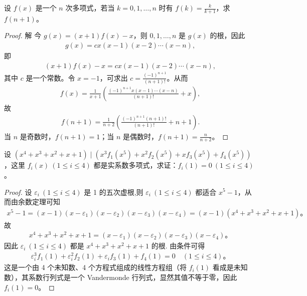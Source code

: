 \documentclass[../../main.tex]{subfiles}%
\begin{document}
\begin{example}
设 $f(x)$ 是一个 $n$ 次多项式，若当 $k = 0, 1, \ldots, n$ 时有 $f(k) = \frac{k}{k + 1}$，求 $f(n + 1)$。
\end{example}
\begin{proof}

解 今 $g(x) = (x + 1)f(x) - x$，则 $0, 1, \ldots, n$ 是 $g(x)$ 的根，因此
\begin{align*}
g(x) = c x(x - 1)(x - 2) \cdots (x - n),
\end{align*}
即
\begin{align*}
(x + 1)f(x) - x = c x(x - 1)(x - 2) \cdots (x - n),
\end{align*}
其中 $c$ 是一个常数。令 $x = -1$，可求出 $c = \frac{(-1)^{n+1}}{(n + 1)!}$。从而
\begin{align*}
f(x) = \frac{1}{x + 1} \left( \frac{(-1)^{n+1} x(x - 1) \cdots (x - n)}{(n + 1)!} + x \right),
\end{align*}
故
\begin{align*}
f(n + 1) = \frac{1}{n + 2} \left( \frac{(-1)^{n+1} (n + 1)!}{(n + 1)!} + n + 1 \right).
\end{align*}
当 $n$ 是奇数时，$f(n + 1) = 1$；当 $n$ 是偶数时，$f(n + 1) = \frac{n}{n + 2}$。

\end{proof}

\begin{example}
设 $(x^4 + x^3 + x^2 + x + 1) \mid (x^3 f_1(x^5) + x^2 f_2(x^5) + x f_3(x^5) + f_4(x^5))$，这里 $f_i(x) \ (1 \leqslant  i \leqslant  4)$ 都是实系数多项式，求证：$f_i(1) = 0 \ (1 \leqslant  i \leqslant  4)$。
\end{example}
\begin{proof}

设 $\varepsilon_i \ (1 \leqslant  i \leqslant  4)$ 是 1 的五次虚根,则 $\varepsilon_i \ (1 \leqslant  i \leqslant  4)$ 都适合 $x^5 - 1$，从而由余数定理可知
\begin{align*}
x^5 - 1 = (x - 1)(x - \varepsilon_1)(x - \varepsilon_2)(x - \varepsilon_3)(x - \varepsilon_4) = (x - 1)(x^4 + x^3 + x^2 + x + 1)。
\end{align*}
故
\begin{align*}
x^4 + x^3 + x^2 + x + 1 = (x - \varepsilon_1)(x - \varepsilon_2)(x - \varepsilon_3)(x - \varepsilon_4)。
\end{align*}
因此 $\varepsilon_i \ (1 \leqslant  i \leqslant  4)$ 都是 $x^4 + x^3 + x^2 + x + 1$ 的根.
由条件可得
\begin{align*}
\varepsilon_i^3 f_1(1) + \varepsilon_i^2 f_2(1) + \varepsilon_i f_3(1) + f_4(1) = 0 \quad (1 \leqslant  i \leqslant  4)。
\end{align*}
这是一个由 4 个未知数、4 个方程式组成的线性方程组（将 $f_i(1)$ 看成是未知数），其系数行列式是一个 Vandermonde 行列式，显然其值不等于零，因此 $f_i(1) = 0$。

\end{proof}
\end{document}
